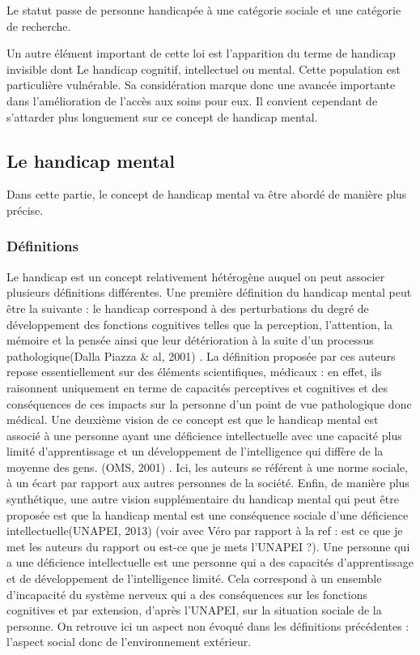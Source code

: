 Le statut passe de \og personne handicapée\fg{} à une catégorie sociale et une catégorie de recherche.

Un autre élément important de cette loi est l'apparition du terme de \og handicap invisible\fg{} dont Le handicap cognitif, intellectuel ou mental. Cette population est particulière vulnérable. Sa considération marque donc une avancée importante dans l'amélioration de l'accès aux soins pour eux. Il convient cependant de s'attarder plus longuement sur ce concept de handicap mental.


\subsection{Le handicap mental}
Dans cette partie, le concept de handicap mental va être abordé de manière plus précise.

\subsubsection{Définitions}

Le handicap est un concept relativement hétérogène auquel on peut associer plusieurs définitions différentes.
Une première définition du handicap mental peut être la suivante : le handicap correspond à \og des perturbations du degré de développement des fonctions cognitives telles que la perception, l’attention, la mémoire et la pensée ainsi que leur détérioration à la suite d’un processus pathologique\fg (Dalla Piazza \& al, 2001) \cite{Piazza2001}. La définition proposée par ces auteurs repose essentiellement sur des éléments scientifiques, médicaux : en effet, ils raisonnent uniquement en terme de capacités perceptives et cognitives et des conséquences de ces impacts sur la personne d'un point de vue pathologique donc médical.
Une deuxième vision de ce concept est que le handicap mental est associé à \og une personne ayant une déficience intellectuelle avec une capacité plus limité d’apprentissage et un développement de l’intelligence qui diffère de la moyenne des gens\fg . (OMS, 2001) \cite{world2001classification}. Ici, les auteurs se référent à une norme sociale, à un écart par rapport aux autres personnes de la société.
Enfin, de manière plus synthétique,  une autre vision supplémentaire du handicap mental qui peut être proposée est que la handicap mental est \og une conséquence sociale d'une déficience intellectuelle\fg (UNAPEI, 2013) \cite{UNAPEI2013} (voir avec Véro par rapport à la ref : est ce que je met les auteurs du rapport ou est-ce que je mets l'UNAPEI ?). Une personne qui a une déficience intellectuelle est une personne qui a des capacités d'apprentissage et de développement de l'intelligence limité. Cela correspond à un ensemble d’incapacité du système nerveux qui a des conséquences sur les fonctions cognitives et par extension, d'après l'UNAPEI, sur la situation sociale de la personne. On retrouve ici un aspect non évoqué dans les définitions précédentes : l'aspect social donc de l'environnement extérieur.


